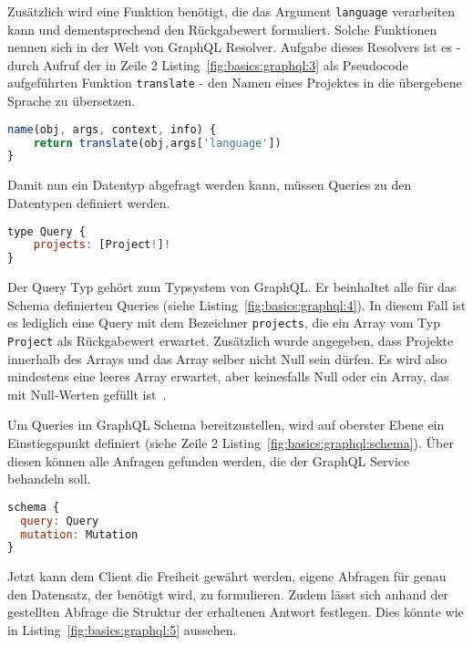 Zusätzlich wird eine Funktion benötigt, die das Argument \texttt{language} verarbeiten kann und dementsprechend den Rückgabewert formuliert.
Solche Funktionen nennen sich in der Welt von GraphQL Resolver.
Aufgabe dieses Resolvers ist es - durch Aufruf der in Zeile 2 Listing~\ref{fig:basics:graphql:3} als Pseudocode aufgeführten Funktion \texttt{translate} -
den Namen eines Projektes in die übergebene Sprache zu übersetzen.

\begin{lstlisting}[language=Javascript,float=h!,caption={Resolver des Feldes \texttt{name}}, label={fig:basics:graphql:3}]
name(obj, args, context, info) {
    return translate(obj,args['language'])
}
\end{lstlisting}

Damit nun ein Datentyp abgefragt werden kann, müssen Queries zu den Datentypen definiert werden.

\begin{lstlisting}[language=Javascript,float=h!,caption={GraphQL Query Typdefinition}, label={fig:basics:graphql:4}]
type Query {
    projects: [Project!]!
}
\end{lstlisting}

Der Query Typ gehört zum Typsystem von GraphQL. Er beinhaltet alle für das Schema definierten Queries (siehe Listing~\ref{fig:basics:graphql:4}). In diesem Fall ist es lediglich eine Query mit dem Bezeichner \texttt{projects}, die
ein Array vom Typ \texttt{Project} als Rückgabewert erwartet. Zusätzlich wurde angegeben, dass Projekte innerhalb des Arrays und das Array selber nicht Null sein dürfen.
Es wird also mindestens eine leeres Array erwartet, aber keinesfalls Null oder ein Array, das mit Null-Werten gefüllt ist~\cite{graphql}.

Um Queries im GraphQL Schema bereitzustellen, wird auf oberster Ebene ein Einstiegspunkt definiert (siehe Zeile 2 Listing~\ref{fig:basics:graphql:schema}). Über diesen können alle Anfragen gefunden werden, die der GraphQL Service behandeln soll.

\begin{lstlisting}[language=Javascript,float=h!,caption={GraphQL Schema Definition}, label={fig:basics:graphql:schema}]
schema {
  query: Query
  mutation: Mutation
}
\end{lstlisting}

Jetzt kann dem Client die Freiheit gewährt werden, eigene Abfragen für genau den Datensatz, der benötigt wird, zu formulieren.
Zudem lässt sich anhand der gestellten Abfrage die Struktur der erhaltenen Antwort festlegen. Dies könnte wie in Listing~\ref{fig:basics:graphql:5} aussehen.

